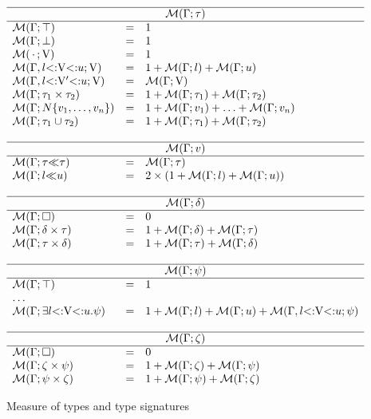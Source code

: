 \begin{figure}
\footnotesize
\[
\begin{array}{lcl}
    \hline
    \multicolumn{3}{c}{\tymsrdflt{\ty}} \\ 
    \hline 
    \tymsrdflt{\tyany} &=& 1\\
    \tymsrdflt{\tybot} &=& 1\\
    \tymsr{\,\EmptyEnv\,}{\vany} &=& 1\\
    \tymsr{\AEnv, \varbound{\vany}{\tylb}{\tyub}}{\vany} &=& 
        1 + \tymsrdflt{\tylb} + \tymsrdflt{\tyub}\\
    \tymsr{\AEnv, \varbound{\vany'}{\tylb}{\tyub}}{\vany} &=& 
        \tymsrdflt{\vany} \\
    \tymsrdflt{\typair{\ty_1}{\ty_2}} &=& 
        1 + \tymsrdflt{\ty_1} + \tymsrdflt{\ty_2}\\
    \tymsrdflt{\tyinv\iname{\rexvar_1,\ldots,\rexvar_n}} &=&
        1 + \tymsrdflt{\rexvar_1} + \ldots + \tymsrdflt{\rexvar_n}\\
    \tymsrdflt{\tyunion{\ty_1}{\ty_2}} &=& 
        1 + \tymsrdflt{\ty_1} + \tymsrdflt{\ty_2}\\
    \\
    \hline
    \multicolumn{3}{c}{\tymsrdflt{\rexvar}} \\ 
    \hline 
    \tymsrdflt{\rexvarbound{\ty}{\ty}} &=& \tymsrdflt{\ty}\\
    \tymsrdflt{\rexvarbound{\tylb}{\tyub}} &=& 
        2\times(1 + \tymsrdflt{\tylb} + \tymsrdflt{\tyub})\\
    \\
    \hline
    \multicolumn{3}{c}{\tymsrdflt{\dctx}} \\ 
    \hline 
    \tymsrdflt{\square} &=& 0\\
    \tymsrdflt{\typair{\dctx}{\ty}} &=& 
        1 + \tymsrdflt{\dctx} + \tymsrdflt{\ty}\\
    \tymsrdflt{\typair{\ty}{\dctx}} &=& 
        1 + \tymsrdflt{\ty} + \tymsrdflt{\dctx}\\
    \\
    \hline
    \multicolumn{3}{c}{\tymsrdflt{\tysig}} \\ 
    \hline 
    \tymsrdflt{\tyany} &=& 1\\
    \multicolumn{3}{l}{\ldots} \\
    \tymsrdflt{\tyexist{\vany}{\tylb}{\tyub}{\tysig}} &=& 
        1 + \tymsrdflt{\tylb} + \tymsrdflt{\tyub} + 
        \tymsr{\AEnv,\varbound{\vany}{\tylb}{\tyub}}{\tysig}\\
    \\
    \hline
    \multicolumn{3}{c}{\tymsrdflt{\dctxsig}} \\ 
    \hline 
    \tymsrdflt{\square} &=& 0\\
    \tymsrdflt{\typair{\dctxsig}{\tysig}} &=& 
        1 + \tymsrdflt{\dctxsig} + \tymsrdflt{\tysig}\\
    \tymsrdflt{\typair{\tysig}{\dctxsig}} &=& 
        1 + \tymsrdflt{\tysig} + \tymsrdflt{\dctxsig}\\
\end{array}
\]
\caption{Measure of types and type signatures}\label{fig:ty-measure}
\end{figure}

